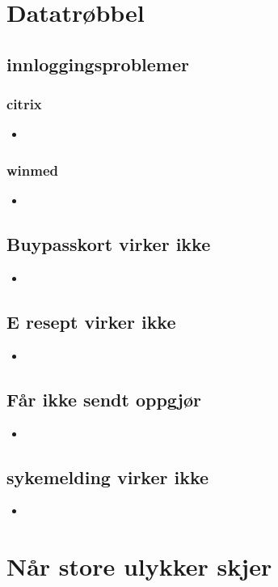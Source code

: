 \documentclass[12pt,a4paper]{memoir}
\begin{document}
\newpage
\chapter{Datatrøbbel}
	\section{innloggingsproblemer}
		\subsection{citrix}
			\begin{itemize}
				\item
			\end{itemize}
		\subsection{winmed}
			\begin{itemize}
				\item
			\end{itemize}
	\section{Buypasskort virker ikke}
		\begin{itemize}
			\item
		\end{itemize}
	\section{E resept virker ikke}
		\begin{itemize}
			\item
		\end{itemize}
	\section{Får ikke sendt oppgjør}
		\begin{itemize}
			\item
		\end{itemize}
	\section{sykemelding virker ikke}%
		\begin{itemize}
			\item
		\end{itemize}

\newpage
\chapter{Når store ulykker skjer}
\end{document}
